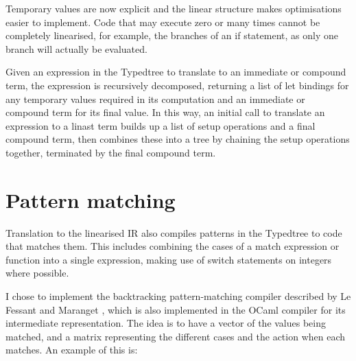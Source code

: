 Temporary values are now explicit and the linear structure makes optimisations easier to implement. Code that may execute zero or many times cannot be completely linearised, for example, the branches of an if statement, as only one branch will actually be evaluated. 

Given an expression in the Typedtree to translate to an immediate or compound term, the expression is recursively decomposed, returning a list of let bindings for any temporary values required in its computation and an immediate or compound term for its final value. In this way, an initial call to translate an expression to a linast term builds up a list of setup operations and a final compound term, then combines these into a tree by chaining the setup operations together, terminated by the final compound term.




\section{Pattern matching}
Translation to the linearised IR also compiles patterns in the Typedtree to code that matches them. This includes combining the cases of a match expression or function into a single expression, making use of switch statements on integers where possible. 

I chose to implement the backtracking pattern-matching compiler described by Le Fessant and Maranget \cite{ocamlpatternmatch}, which is also implemented in the OCaml compiler for its intermediate representation. 
The idea is to have a vector of the values being matched, and a matrix representing the different cases and the action when each matches. An example of this is:

